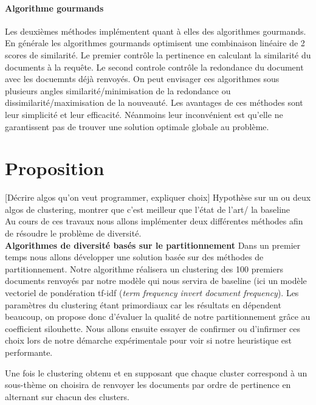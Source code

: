 \documentclass{article}
\begin{document}
\paragraph{Algorithme gourmands}
Les deuxièmes méthodes implémentent quant à elles des algorithmes gourmands. En générale les algorithmes gourmands optimisent une combinaison linéaire de 2 scores de similarité. Le premier contrôle la pertinence en calculant la similarité du documents à la requête. Le second controle contrôle la redondance du document avec les docuemnts déjà renvoyés. On peut envisager ces algorithmes sous plusieurs angles similarité/minimisation de la redondance ou dissimilarité/maximisation de la nouveauté. Les avantages de ces méthodes sont leur simplicité et leur efficacité. Néanmoins leur inconvénient est qu'elle ne garantissent pas de trouver une solution optimale globale au problème.

\section{Proposition}
[Décrire algos qu'on veut programmer, expliquer choix] 
Hypothèse sur un ou deux algos de clustering, montrer que c'est meilleur que l'état de l'art/ la baseline \\
Au cours de ces travaux nous allons implémenter deux différentes méthodes afin de résoudre le problème de diversité. \\
\textbf{Algorithmes de diversité basés sur le partitionnement} Dans un premier temps nous allons développer une solution basée sur des méthodes de partitionnement. Notre algorithme réalisera un clustering des 100 premiers documents renvoyés par notre modèle qui nous servira de baseline (ici un modèle vectoriel de pondération tf-idf (\textit{term frequency invert document frequency}). Les paramètres du clustering étant primordiaux car les résultats en dépendent beaucoup, on propose donc d'évaluer la qualité de notre partitionnement grâce au coefficient silouhette. Nous allons ensuite essayer de confirmer ou d'infirmer ces choix lors de notre démarche expérimentale pour voir si notre heuristique est performante. 

Une fois le clustering obtenu et en supposant que chaque cluster correspond à un sous-thème on choisira de renvoyer les documents par ordre de pertinence en alternant sur chacun des clusters. 
\end{document}
